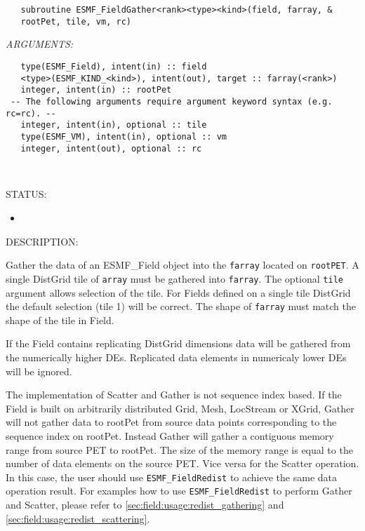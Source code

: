   
\begin{verbatim}   subroutine ESMF_FieldGather<rank><type><kind>(field, farray, & 
   rootPet, tile, vm, rc) 
   \end{verbatim}{\em ARGUMENTS:}
\begin{verbatim}   type(ESMF_Field), intent(in) :: field 
   <type>(ESMF_KIND_<kind>), intent(out), target :: farray(<rank>) 
   integer, intent(in) :: rootPet 
 -- The following arguments require argument keyword syntax (e.g. rc=rc). --
   integer, intent(in), optional :: tile 
   type(ESMF_VM), intent(in), optional :: vm 
   integer, intent(out), optional :: rc 
   
   
   \end{verbatim}
{\sf STATUS:}
   \begin{itemize} 
   \item{} 
   \end{itemize} 
   
{\sf DESCRIPTION:\\ }

 
   Gather the data of an {ESMF\_Field} object into the {\tt farray} located on 
   {\tt rootPET}. A single DistGrid tile of {\tt array} must be 
   gathered into {\tt farray}. The optional {\tt tile} 
   argument allows selection of the tile. For Fields defined on a single 
   tile DistGrid the default selection (tile 1) will be correct. The 
   shape of {\tt farray} must match the shape of the tile in Field. 
   
   If the Field contains replicating DistGrid dimensions data will be 
   gathered from the numerically higher DEs. Replicated data elements in 
   numericaly lower DEs will be ignored. 
   
   The implementation of Scatter and Gather is not sequence index based. 
   If the Field is built on arbitrarily distributed Grid, Mesh, LocStream or XGrid, 
   Gather will not gather data to rootPet 
   from source data points corresponding to the sequence index on rootPet. 
   Instead Gather will gather a contiguous memory range from source PET to 
   rootPet. The size of the memory range is equal to the number of 
   data elements on the source PET. Vice versa for the Scatter operation. 
   In this case, the user should use {\tt ESMF\_FieldRedist} to achieve 
   the same data operation result. For examples how to use {\tt ESMF\_FieldRedist} 
   to perform Gather and Scatter, please refer to 
   \ref{sec:field:usage:redist_gathering} and 
   \ref{sec:field:usage:redist_scattering}. 
   
